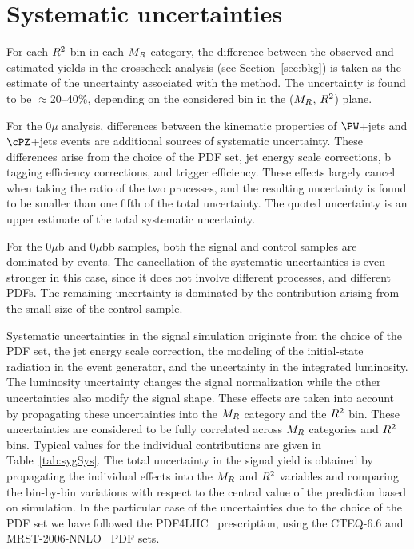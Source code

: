 \section{Systematic uncertainties}\label{sec:sys}

For each $R^2$ bin in each $M_R$ category, the
difference between the observed and estimated yields in the
crosscheck analysis (see Section~\ref{sec:bkg}) is taken as the estimate of the uncertainty associated with the
method. The uncertainty is found to
be ${\approx}$20--40\%, depending on the considered bin in the
($M_R$, $R^2$) plane.

For the 0$\mu$ analysis, differences between the kinematic properties of $\PW$+jets and
$\cPZ$+jets events are additional sources of systematic uncertainty. These
differences arise from the choice of the PDF set, jet energy scale
corrections, b tagging efficiency
corrections, and trigger efficiency. These effects largely cancel when taking the ratio of the two processes, and the resulting
uncertainty is found to be smaller than one fifth
of the total uncertainty.  The quoted uncertainty is an upper
estimate of the total systematic uncertainty.

For the 0$\mu$b and 0$\mu$bb samples, both the signal and control samples are dominated by \ttbar events. The cancellation of the
systematic uncertainties is even stronger in
this case, since it does not involve different processes, and different
PDFs. The remaining uncertainty is
dominated by the contribution arising from the small size of the control
sample.

Systematic uncertainties in the signal simulation
originate from the choice of the PDF set,
the jet energy scale correction, the modeling of the initial-state radiation in the event
generator, and the uncertainty in the integrated luminosity. The
luminosity uncertainty changes the signal normalization while the other
uncertainties also modify the signal shape.
These effects are taken into account by propagating these
uncertainties into the $M_R$ category and the $R^2$ bin. These uncertainties are
considered to be fully correlated across $M_R$ categories and
$R^2$ bins. Typical values for the individual contributions
are given in Table~\ref{tab:sygSys}. The total uncertainty in the
signal yield is obtained by propagating the individual effects into
the $M_R$ and $R^2$ variables and comparing the bin-by-bin variations with respect to the central value of the prediction
based on simulation. In the particular case of the uncertainties due
to the choice of the PDF set we have followed the PDF4LHC~\cite{Bourilkov:2006cj,Alekhin:2011sk,Botje:2011sn} prescription, using the CTEQ-6.6\cite{Nadolsky:2008zw} and MRST-2006-NNLO~\cite{Martin:2007bv} PDF sets.

